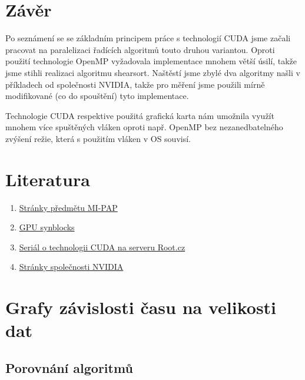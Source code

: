\documentclass[12pt]{article}
\begin{document}
\section{Závěr}
Po seznámení se se základním principem práce s technologií CUDA jsme začali pracovat na paralelizaci řadících algoritmů touto druhou variantou. Oproti použití technologie OpenMP vyžadovala implementace mnohem větší úsilí, takže jsme stihli realizaci algoritmu shearsort. Naštěstí jsme zbylé dva algoritmy našli v příkladech od společnosti NVIDIA, takže pro měření jsme použili mírně modifikované (co do spouštění) tyto implementace.

Technologie CUDA respektive použitá grafická karta nám umožnila využít mnohem více spuštěných vláken oproti např. OpenMP bez nezanedbatelného zvýšení režie, která s použitím vláken v OS souvisí. 
\section{Literatura}
\begin{enumerate}
\item \href{https://edux.fit.cvut.cz/courses/MI-PAP}{Stránky předmětu MI-PAP}
\item \href{http://aggregate.org/MAGIC/#GPU SyncBlocks}{\label{cud:synblocks}GPU synblocks}
\item \href{http://www.root.cz/serialy/uvod-do-technologie-cuda/}{Seriál o technologii CUDA na serveru Root.cz}
\item \href{http://developer.nvidia.com/}{Stránky společnosti NVIDIA}
\end{enumerate}

\appendix
\section{Grafy závislosti času na velikosti dat}

\subsection{Porovnání algoritmů}
\end{document}
